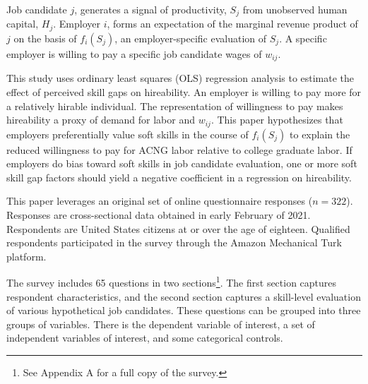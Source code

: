 \documentclass[review]{elsarticle}
\begin{document}
Job candidate $j$, generates a signal of productivity, $S_j$ from unobserved human capital, $H_j$.
Employer $i$, forms an expectation of the marginal revenue product of $j$ on the basis of $f_i(S_j)$, an employer-specific evaluation of $S_j$.
A specific employer is willing to pay a specific job candidate wages of $w_{ij}$.

This study uses ordinary least squares (OLS) regression analysis to estimate the effect of perceived skill gaps on hireability.
An employer is willing to pay more for a relatively hirable individual.
The representation of willingness to pay makes hireability a proxy of demand for labor and $w_{ij}$.
%
This paper hypothesizes that employers preferentially value soft skills in the course of $f_i(S_j)$
to explain the reduced willingness to pay for ACNG labor relative to college graduate labor.
If employers do bias toward soft skills in job candidate evaluation,
one or more soft skill gap factors should yield a negative coefficient
in a regression on hireability.

This paper leverages an original set of online questionnaire responses ($n = 322$).
Responses are cross-sectional data obtained in early February of 2021.
Respondents are United States citizens at or over the age of eighteen.
Qualified respondents participated in the survey through the Amazon Mechanical Turk platform.

The survey includes 65 questions in two sections\footnote{See Appendix A for a full copy of the survey.}.
The first section captures respondent characteristics,
and the second section captures a skill-level evaluation of various hypothetical job candidates.
These questions can be grouped into three groups of variables.
There is the dependent variable of interest, a set of independent variables of interest,
and some categorical controls.
\end{document}
